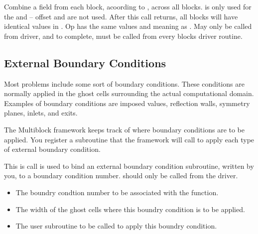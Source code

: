 \documentclass[10pt]{article}
\begin{document}
\vspace{0.2in}
     Combine a field from each block, acoording to , across all blocks.
 is only used for the  and -- offset and
 are not used.  After this call returns, all blocks will have
identical values in .  Op has the same values and meaning as
.
     May only be called from driver, and to complete, must be called
     from every blocks driver routine.

\vspace{0.2in}

\subsection{External Boundary Conditions}

Most problems include some sort of boundary conditions.  These conditions
are normally applied in the ghost cells surrounding the actual computational domain.
Examples of boundary conditions are imposed values, reflection walls, symmetry planes,
inlets, and exits.

The Multiblock framework keeps track of where boundary conditions are to be applied.
You register a subroutine that the framework will call to apply each type of 
external boundary condition.

\vspace{0.2in}
This is call is used to bind an external boundary condition subroutine,
written by you, to a boundary condition number.
 should only be called from the driver.

\begin{itemize}
	\item {} The boundry condtion number to be associated with the 
	function.
	\item {} The width of the ghost cells where this boundry
	condition is to be applied.
	\item {} The user subroutine to be called to apply this
	boundry condition.
\end{itemize}
\end{document}
